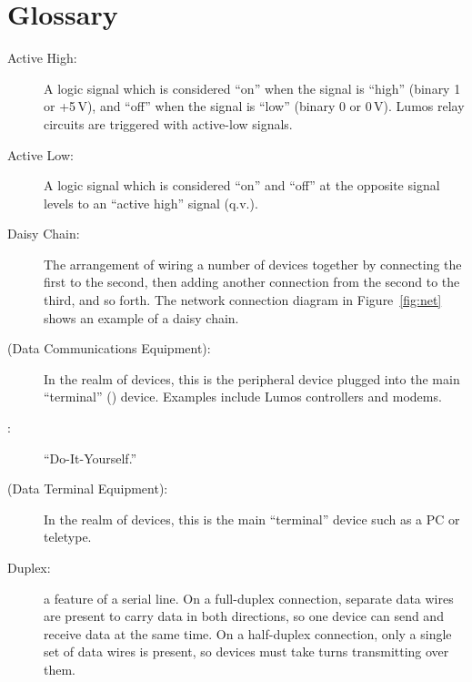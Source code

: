 \documentclass[letterpaper,twoside,onecolumn,openright,final]{memoir}
\begin{document}


\chapter{Glossary}\label{ch:glossary}
\begin{description}
	\item[Active High:]
		A logic signal which is considered ``on'' when the signal is ``high'' (binary 1 or +5\,V),
		and ``off'' when the signal is ``low'' (binary 0 or 0\,V).  Lumos relay circuits are 
		triggered with active-low signals.
	\item[Active Low:]
		A logic signal which is considered ``on'' and ``off'' at the opposite signal levels
		to an ``active high'' signal (q.v.).
	\item[Daisy Chain:]
		The arrangement of wiring a number of devices together by connecting the first to the second,
		then adding another connection from the second to the third, and so forth.  The network
		connection diagram in Figure~\ref{fig:net} shows an example of a daisy chain.
	\item[ (Data Communications Equipment):]  In the realm of  devices, this is the peripheral
		device plugged into the main ``terminal'' () device.  Examples include
		Lumos controllers and modems.
	\item[:] ``Do-It-Yourself.''
	\item[ (Data Terminal Equipment):]  In the realm of  devices, this is the
		main ``terminal'' device such as a PC or teletype.
	\item[Duplex:]
		a feature of a serial line.  On a full-duplex connection, separate data wires are present
		to carry data in both directions, so one device can send and receive data at the same time.
		On a half-duplex connection, only a single set of data wires is present, so devices must
		take turns transmitting over them.

\end{description}
\end{document}
